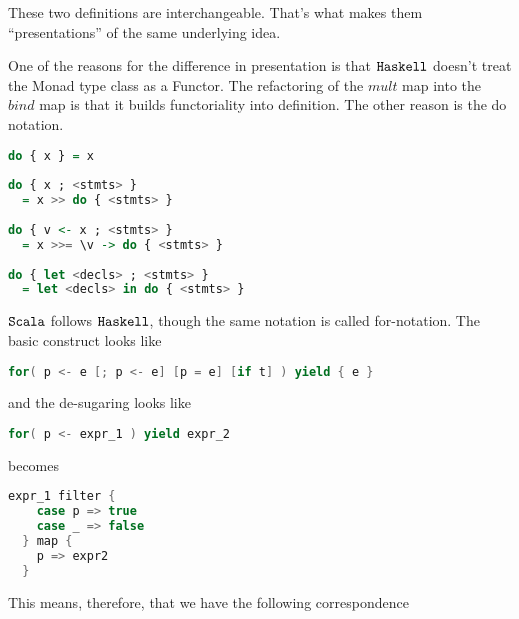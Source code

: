 These two definitions are interchangeable. That's what makes them
``presentations'' of the same underlying idea.

One of the reasons for the difference in presentation is that $\texttt{Haskell}$
doesn't treat the Monad type class as a Functor. The refactoring of
the $mult$ map into the $bind$ map is that it builds functoriality
into definition. The other reason is the do notation.

\begin{lstlisting}[language=Haskell]
do { x } = x
 
do { x ; <stmts> }
  = x >> do { <stmts> }
 
do { v <- x ; <stmts> }
  = x >>= \v -> do { <stmts> }
 
do { let <decls> ; <stmts> }
  = let <decls> in do { <stmts> }
\end{lstlisting}

$\texttt{Scala}$ follows $\texttt{Haskell}$, though the same notation is called
for-notation. The basic construct looks like

\begin{lstlisting}[language=Scala]
  for( p <- e [; p <- e] [p = e] [if t] ) yield { e }
\end{lstlisting}

and the de-sugaring looks like

\begin{lstlisting}[language=Scala,mathescape=true]
  for( p <- expr_1 ) yield expr_2 
\end{lstlisting}

becomes

\begin{lstlisting}[language=Scala,mathescape=true]
  expr_1 filter {
    case p => true
    case _ => false
  } map {
    p => expr2
  }
\end{lstlisting}

This means, therefore, that we have the following correspondence



